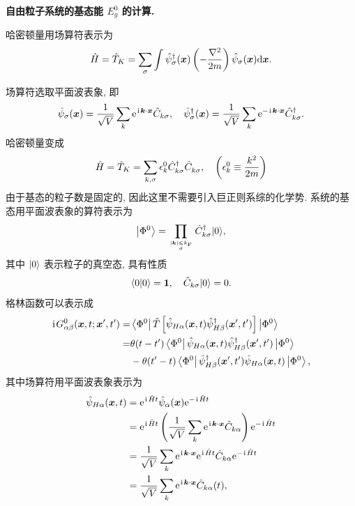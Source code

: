 \begin{example}
    \textbf{自由粒子系统的基态能 $E_g^0$ 的计算.}

    哈密顿量用场算符表示为
    \begin{equation}
        \hat{H}=\hat{T}_K=\sum_\sigma\int\hat\psi_\sigma^\dagger(\boldsymbol{x})\left( -\frac{\nabla^2}{2m} \right)\hat\psi_\sigma(\boldsymbol{x})\mathrm{d}\boldsymbol{x}.
    \end{equation}
\end{example}
场算符选取平面波表象, 即
\begin{equation}
    \hat{\psi}_\sigma(\boldsymbol{x})=\frac{1}{\sqrt{V}}\sum_k\mathrm{e}^{\hspace{0.1em}\mathrm{i}\hspace{0.1em}\boldsymbol{k}\cdot\boldsymbol{x}}\hat{C}_{k\sigma},\quad\hat\psi_\sigma^\dagger(\boldsymbol{x})=\frac{1}{\sqrt{V}}\sum_k\mathrm{e}^{-\hspace{0.1em}\mathrm{i}\hspace{0.1em}\boldsymbol{k}\cdot\boldsymbol{x}}\hat{C}_{k\sigma}^\dagger.
\end{equation}
哈密顿量变成
\begin{equation}
    \hat{H}=\hat{T}_K=\sum_{k,\sigma}\epsilon_k^0\hat{C}_{k\sigma}^\dagger\hat{C}_{k\sigma}^{ },\quad\left( \epsilon_k^0\equiv\frac{k^2}{2m} \right)
\end{equation}
由于基态的粒子数是固定的, 因此这里不需要引入巨正则系综的化学势. 系统的基态用平面波表象的算符表示为
\begin{equation}
    \left|\Phi^0\right\rangle=\prod_{|\boldsymbol{k}|\leqslant k_{\mathrm{F}}\atop\sigma}\hat{C}_{k\sigma}^\dagger|0\rangle,
\end{equation}
其中 $|0\rangle$ 表示粒子的真空态, 具有性质
\begin{equation}
    \langle 0|0\rangle =\mathbf{1},\quad\hat{C}_{k\sigma}|0\rangle=0.
\end{equation}
格林函数可以表示成
 \begin{align}
        \hspace{0.1em}\mathrm{i}\hspace{0.1em} G_{\alpha\beta}^{0}(\boldsymbol{x},t;\boldsymbol{x}',t')=&\left\langle\Phi^0\right|\hat{T}\left[ \hat{\psi}_{H\alpha}(\boldsymbol{x},t)\hat{\psi}_{H\beta}^\dagger(\boldsymbol{x}',t') \right] \left|\Phi^0\right\rangle\nonumber\\
        =&\theta(t-t')\left\langle\Phi^0\right|\hat{\psi}_{H\alpha}(\boldsymbol{x},t)\hat\psi_{H\beta}^\dagger(\boldsymbol{x}',t')\left|\Phi^0\right\rangle\nonumber\\
        &-\theta(t'-t)\left\langle\Phi^0\right|\hat{\psi}_{H\beta}^\dagger(\boldsymbol{x}',t')\hat\psi_{H\alpha}(\boldsymbol{x},t)\left|\Phi^0\right\rangle,
    \end{align}
其中场算符用平面波表象表示为
  \begin{align}
        \hat{\psi}_{H\alpha}(\boldsymbol{x},t)&=\mathrm{e}^{\hspace{0.1em}\mathrm{i}\hspace{0.1em}\hat{H}t}\hat{\psi}_{\alpha}(\boldsymbol{x})\mathrm{e}^{-\hspace{0.1em}\mathrm{i}\hspace{0.1em}\hat{H}t}\nonumber\\
        &=\mathrm{e}^{\hspace{0.1em}\mathrm{i}\hspace{0.1em}\hat{H}t}\left( \frac{1}{\sqrt{V}}\sum_k\mathrm{e}^{\hspace{0.1em}\mathrm{i}\hspace{0.1em}\boldsymbol{k}\cdot\boldsymbol{x}}\hat{C}_{k\alpha} \right)\mathrm{e}^{-\hspace{0.1em}\mathrm{i}\hspace{0.1em}\hat{H}t}\nonumber\\
        &=\frac{1}{\sqrt{V}}\sum_k\mathrm{e}^{\hspace{0.1em}\mathrm{i}\hspace{0.1em}\boldsymbol{k}\cdot\boldsymbol{x}}\mathrm{e}^{\hspace{0.1em}\mathrm{i}\hspace{0.1em}\hat{H}t}\hat{C}_{k\alpha}\mathrm{e}^{-\hspace{0.1em}\mathrm{i}\hspace{0.1em}\hat{H}t}\nonumber\\
        &=\frac{1}{\sqrt{V}}\sum_k\mathrm{e}^{\hspace{0.1em}\mathrm{i}\hspace{0.1em}\boldsymbol{k}\cdot\boldsymbol{x}}\hat{C}_{k\alpha}(t),
    \end{align}
